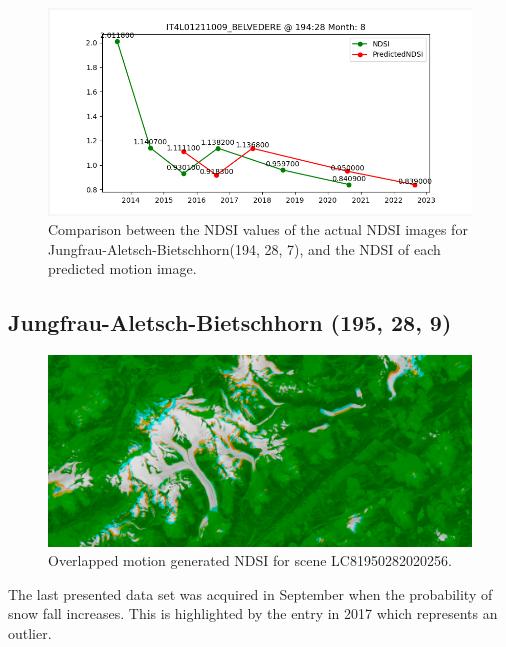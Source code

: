 \documentclass[12pt, a4paper]{report}
\begin{document}
	\begin{figure}[h!]
		\centering
		\includegraphics[scale=0.5]{../images/experiment_194288.png}
		\caption{Comparison between the NDSI values of the actual NDSI images for Jungfrau-Aletsch-Bietschhorn(194, 28, 7), and the NDSI of each predicted motion image.}
		\label{fig:jungfrau_194288}
	\end{figure}
	
	
	\newpage{}
	
	\subsection{Jungfrau-Aletsch-Bietschhorn (195, 28, 9)}
	
	\begin{figure}[h!]
		\centering
		\includegraphics[width=\linewidth]{../images/experiment_1950289.png}
		\caption{Overlapped motion generated NDSI for scene LC81950282020256.}
		\label{fig:experiment_1950289_image}
	\end{figure}

	The last presented data set was acquired in September when the probability of snow fall increases. This is highlighted by the entry in 2017 which represents an outlier.
	
\end{document}
